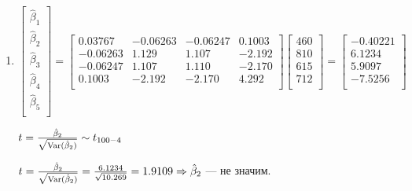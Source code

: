 \documentclass[pdftex,11pt,openany]{book}\usepackage[]{graphicx}\usepackage[]{color}
\begin{document}
\begin{solution}
\begin{enumerate}
\item $\begin{bmatrix}
\hat{\beta}_1 \\
\hat{\beta}_2 \\
\hat{\beta}_3 \\
\hat{\beta}_4 \\
\hat{\beta}_5 \\
\end{bmatrix} = \begin{bmatrix}
0.03767 & -0.06263 & -0.06247 & 0.1003 \\
-0.06263 & 1.129 & 1.107 & -2.192 \\
-0.06247 & 1.107 & 1.110 & -2.170 \\
0.1003 & -2.192 & -2.170 & 4.292 \\
\end{bmatrix} \begin{bmatrix}
460\\
810\\
615\\
712\\
\end{bmatrix} = \begin{bmatrix}
-0.40221 \\
6.1234 \\
5.9097 \\
-7.5256 \\
\end{bmatrix}$

$t = \frac{\hat{\beta}_2}{\sqrt{\operatorname{Var}(\hat{\beta}_2)}} \sim t_{100-4}$

$t = \frac{\hat{\beta}_2}{\sqrt{\operatorname{Var}(\hat{\beta}_2)}} = \frac{6.1234}{\sqrt{10.269}} = 1.9109 \Rightarrow \hat{\beta}_2$ --- не значим.
\end{enumerate}
\end{solution}
\end{document}
